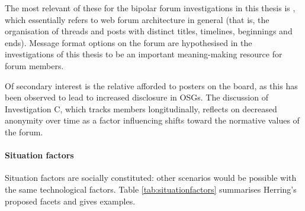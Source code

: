 				The most relevant of these for the bipolar forum investigations in this thesis is , which essentially refers to web forum architecture in general (that is, the organisation of threads and posts with distinct titles, timelines, beginnings and ends). Message format options on the forum are hypothesised in the investigations of this thesis to be an important meaning-making resource for forum members.

				Of secondary interest is the relative  afforded to posters on the board, as this has been observed to lead to increased disclosure in OSGs. The discussion of Investigation C, which tracks members longitudinally, reflects on decreased anonymity over time as a factor influencing shifts toward the normative values of the forum.

			\paragraph{Situation factors}

				Situation factors are socially constituted: other scenarios would be possible with the same technological factors. Table \ref{tab:situationfactors} summarises Herring's proposed facets and gives examples.

